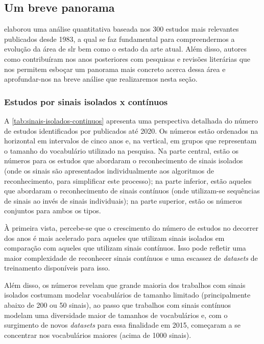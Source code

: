 \subsection{Um breve panorama}
\label{sec:slr-breve-panorama}

 elaborou uma análise quantitativa baseada nos 300 estudos mais relevantes publicados desde 1983, a qual se faz fundamental para compreendermos a evolução da área de \acrshort{slr} bem como o estado da arte atual. Além disso, autores como  contribuíram nos anos posteriores com pesquisas e revisões literárias que nos permitem esboçar um panorama mais concreto acerca dessa área e aprofundar-nos na breve análise que realizaremos nesta seção.


\subsubsection{Estudos por sinais isolados x contínuos}
\label{sec:slr-sinais-isolados-continuos}

A \autoref{tab:sinais-isolados-continuos} apresenta uma perspectiva detalhada do número de estudos identificados por  publicados até 2020. Os números estão ordenados na horizontal em intervalos de cinco anos e, na vertical, em grupos que representam o tamanho do vocabulário utilizado na pesquisa. Na parte central, estão os números para os estudos que abordaram o reconhecimento de sinais isolados (onde os sinais são apresentados individualmente aos algoritmos de reconhecimento, para simplificar este processo); na parte inferior, estão aqueles que abordaram o reconhecimento de sinais contínuos (onde utilizam-se sequências de sinais ao invés de sinais individuais); na parte superior, estão os números conjuntos para ambos os tipos.



À primeira vista, percebe-se que o crescimento do número de estudos no decorrer dos anos é mais acelerado para aqueles que utilizam sinais isolados em comparação com aqueles que utilizam sinais contínuos. Isso pode refletir uma maior complexidade de reconhecer sinais contínuos e uma escassez de \textit{datasets} de treinamento disponíveis para isso. 

Além disso, os números revelam que grande maioria dos trabalhos com sinais isolados costumam modelar vocabulários de tamanho limitado (principalmente abaixo de 200 ou 50 sinais), ao passo que trabalhos com sinais contínuos modelam uma diversidade maior de tamanhos de vocabulários e, com o surgimento de novos \textit{datasets} para essa finalidade em 2015, começaram a se concentrar nos vocabulários maiores (acima de 1000 sinais).



